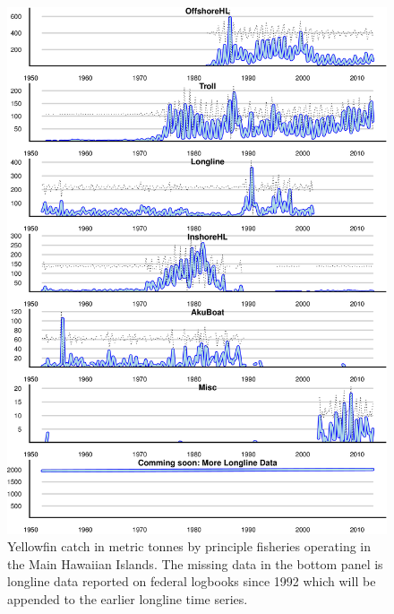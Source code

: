 \documentclass[12pt,letterpaper]{article}
\begin{document}
\begin{figure}
\begin{center}
\includegraphics[height=0.9\textheight]{./graphics/catch_history.png}
\caption{\label{fig:catchTS}
Yellowfin catch in metric tonnes by principle fisheries operating in
the Main Hawaiian Islands. The missing data in the bottom panel is
longline data reported on federal logbooks since 1992 which will be
appended to the earlier longline time series.}
\end{center}
\end{figure}
\end{document}
